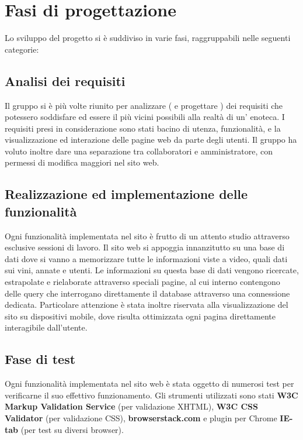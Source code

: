 \section{Fasi di progettazione}

Lo sviluppo del progetto si è suddiviso in varie fasi, raggruppabili nelle seguenti categorie:

\subsection{Analisi dei requisiti}

Il gruppo si è più volte riunito per analizzare ( e progettare ) dei requisiti che potessero soddisfare ed essere il più vicini possibili alla realtà di un' enoteca. 
I requisiti presi in considerazione sono stati bacino di utenza, funzionalità,
e la visualizzazione ed interazione delle pagine web da parte degli utenti. 
Il gruppo ha voluto inoltre dare una separazione tra collaboratori e amministratore, con permessi di modifica maggiori nel sito web. 

\subsection{Realizzazione ed implementazione delle funzionalità}

Ogni funzionalità implementata nel sito è frutto di un attento studio attraverso esclusive sessioni di lavoro.
Il sito web si appoggia innanzitutto su una base di dati dove si vanno a memorizzare tutte le informazioni viste a video, quali dati sui vini, annate e utenti. 
Le informazioni su questa base di dati vengono ricercate, estrapolate e rielaborate attraverso speciali pagine, al cui interno contengono delle
query che interrogano direttamente il database attraverso una connessione dedicata.
Particolare attenzione è stata inoltre riservata alla visualizzazione del sito su dispositivi mobile, dove risulta ottimizzata ogni pagina direttamente interagibile dall'utente.

\subsection{Fase di test}

Ogni funzionalità implementata nel sito web è stata oggetto di numerosi test per verificarne il suo effettivo funzionamento. Gli strumenti utilizzati sono stati \textbf{W3C Markup Validation Service} (per validazione XHTML), \textbf{W3C CSS Validator} (per validazione CSS), \textbf{browserstack.com} e plugin per Chrome \textbf{IE-tab} (per test su diversi browser).

